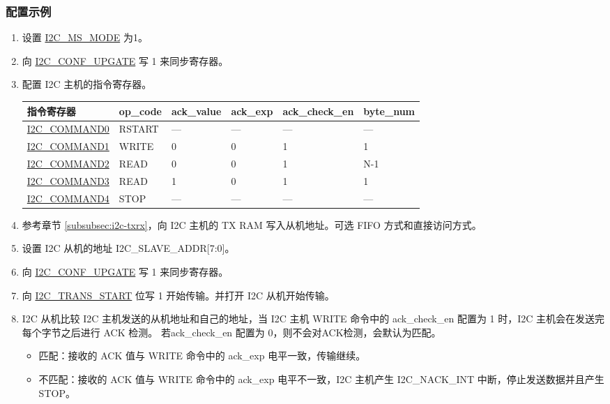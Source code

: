\documentclass[main\_\_CN.tex]{subfiles}
\begin{document}
\subsubsection{配置示例}
\begin{enumerate}
\item 设置 \hyperref[fielddesc:I2CMSMODE]{I2C\_MS\_MODE} 为1。
\item 向 \hyperref[fielddesc:I2CCONFUPGATE]{I2C\_CONF\_UPGATE} 写 1 来同步寄存器。
\item 配置 I2C 主机的指令寄存器。
\begin{longtable}{ | p{4cm} | p{2cm} | p{2cm} | p{2cm} |p{2cm} | p{2cm} |}
\hline\rowcolor{lightgray}
指令寄存器& op\_code & ack\_value&ack\_exp&ack\_check\_en&byte\_num  \\ \hline
\hyperref[fielddesc:I2CCOMMAND0]{I2C\_COMMAND0} & RSTART& ---&---&---&---  \\ \hline
\hyperref[fielddesc:I2CCOMMAND1]{I2C\_COMMAND1} & WRITE& 0&0&1&1  \\ \hline
\hyperref[fielddesc:I2CCOMMAND2]{I2C\_COMMAND2} & READ& 0&0&1&N-1  \\ \hline
\hyperref[fielddesc:I2CCOMMAND3]{I2C\_COMMAND3} & READ& 1&0&1&1  \\ \hline
\hyperref[fielddesc:I2CCOMMAND4]{I2C\_COMMAND4} & STOP& ---&---&---&---  \\ \hline
\end{longtable}
\item 参考章节 \ref{subsubsec:i2c-txrx}，向 I2C 主机的 TX RAM 写入从机地址。可选 FIFO 方式和直接访问方式。

\item 设置 I2C 从机的地址 I2C\_SLAVE\_ADDR[7:0]。

\item 向 \hyperref[fielddesc:I2CCONFUPGATE]{I2C\_CONF\_UPGATE} 写 1 来同步寄存器。
\item 向 \hyperref[fielddesc:I2CTRANSSTART]{I2C\_TRANS\_START} 位写 1 开始传输。并打开 I2C 从机开始传输。

\item I2C 从机比较 I2C 主机发送的从机地址和自己的地址，当 I2C 主机 WRITE 命令中的 ack\_check\_en 配置为 1 时，I2C 主机会在发送完每个字节之后进行 ACK 检测。 若ack\_check\_en 配置为 0，则不会对ACK检测，会默认为匹配。
\begin{itemize}
\item 匹配：接收的 ACK 值与 WRITE 命令中的 ack\_exp 电平一致，传输继续。
\item 不匹配：接收的 ACK 值与 WRITE 命令中的 ack\_exp 电平不一致，I2C 主机产生 I2C\_NACK\_INT 中断，停止发送数据并且产生 STOP。
\end{itemize}


\end{enumerate}
\end{document}

